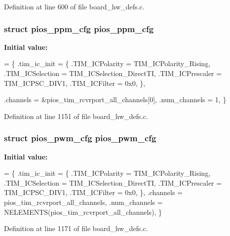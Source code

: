 Definition at line 600 of file board\-\_\-hw\-\_\-defs.\-c.

\hypertarget{group___tau_labs_core_ga256c8c512691a72ee2ed15d1a9041810}{
\subsubsection[{pios\-\_\-ppm\-\_\-cfg}]{\setlength{\rightskip}{0pt plus 5cm}struct {\bf pios\-\_\-ppm\-\_\-cfg} {\bf pios\-\_\-ppm\-\_\-cfg}}}\label{group___tau_labs_core_ga256c8c512691a72ee2ed15d1a9041810}
{\bfseries Initial value\-:}
\begin{DoxyCode}
= \{
        .tim\_ic\_init = \{
                .TIM\_ICPolarity = TIM\_ICPolarity\_Rising,
                .TIM\_ICSelection = TIM\_ICSelection\_DirectTI,
                .TIM\_ICPrescaler = TIM\_ICPSC\_DIV1,
                .TIM\_ICFilter = 0x0,
        \},
        
        .channels = &pios\_tim\_rcvrport\_all\_channels[0],
        .num\_channels = 1,
\}
\end{DoxyCode}


Definition at line 1151 of file board\-\_\-hw\-\_\-defs.\-c.

\hypertarget{group___tau_labs_core_ga7587f8e174df90bef8cec1edfa9e14c1}{
\subsubsection[{pios\-\_\-pwm\-\_\-cfg}]{\setlength{\rightskip}{0pt plus 5cm}struct {\bf pios\-\_\-pwm\-\_\-cfg} {\bf pios\-\_\-pwm\-\_\-cfg}}}\label{group___tau_labs_core_ga7587f8e174df90bef8cec1edfa9e14c1}
{\bfseries Initial value\-:}
\begin{DoxyCode}
= \{
        .tim\_ic\_init = \{
                .TIM\_ICPolarity = TIM\_ICPolarity\_Rising,
                .TIM\_ICSelection = TIM\_ICSelection\_DirectTI,
                .TIM\_ICPrescaler = TIM\_ICPSC\_DIV1,
                .TIM\_ICFilter = 0x0,
        \},
        .channels = pios\_tim\_rcvrport\_all\_channels,
        .num\_channels = NELEMENTS(pios\_tim\_rcvrport\_all\_channels),
\}
\end{DoxyCode}


Definition at line 1171 of file board\-\_\-hw\-\_\-defs.\-c.

